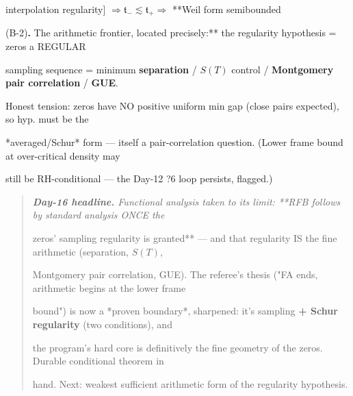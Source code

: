 \documentclass[10pt]{article}
\begin{document}
  interpolation regularity] $\Rightarrow\mathfrak t_-\lesssim\mathfrak t_+\Rightarrow$ **Weil form semibounded\par
  (B-2)\textbf{. }The arithmetic frontier, located precisely:** the regularity hypothesis = zeros a REGULAR\par
  sampling sequence = minimum \textbf{separation} / $S(T)$ control / \textbf{Montgomery pair correlation} / \textbf{GUE}.\par
  Honest tension: zeros have NO positive uniform min gap (close pairs expected), so hyp. must be the\par
  *averaged/Schur* form --- itself a pair-correlation question. (Lower frame bound at over-critical density may\par
  still be RH-conditional --- the Day-12 ?6 loop persists, flagged.)\par

\begin{quote}\itshape
\textbf{Day-16 headline.} Functional analysis taken to its limit: **RFB follows by standard analysis ONCE the\par
zeros' sampling regularity is granted** --- and that regularity IS the fine arithmetic (separation, $S(T)$,\par
Montgomery pair correlation, GUE). The referee's thesis ("FA ends, arithmetic begins at the lower frame\par
bound") is now a *proven boundary*, sharpened: it's sampling \textbf{+ Schur regularity} (two conditions), and\par
the program's hard core is definitively the fine geometry of the zeros. Durable conditional theorem in\par
hand. Next: weakest sufficient arithmetic form of the regularity hypothesis.\par
\end{quote}
\end{document}
